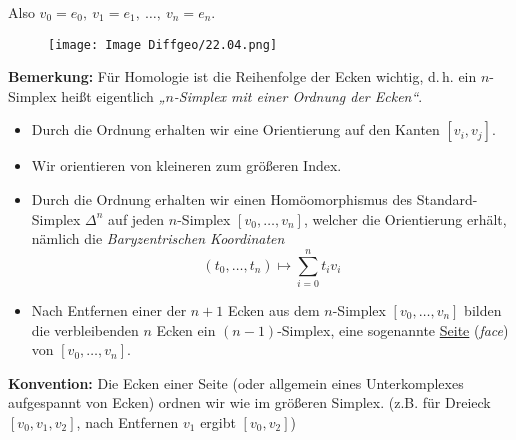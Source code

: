 \documentclass[fleqn, 12pt, letterpaper]{article}
\begin{document}
Also $v_0 = e_0,\ v_1 = e_1,\ \dots,\ v_n = e_n$.
\begin{figure}[H]
    \centering
    \texttt{[image: Image Diffgeo/22.04.png]}
 \end{figure}

\textbf{Bemerkung:}
Für Homologie ist die Reihenfolge der Ecken wichtig, d.\,h. ein $n$-Simplex heißt eigentlich \emph{„$n$-Simplex mit einer Ordnung der Ecken“}.

\begin{itemize}
  \item Durch die Ordnung erhalten wir eine Orientierung auf den Kanten $\left[ v_i, v_j \right]$.
  
  \item Wir orientieren von kleineren zum größeren Index.
  
  \item Durch die Ordnung erhalten wir einen Homöomorphismus des Standard-Simplex $\Delta^n$ auf jeden $n$-Simplex $\left[ v_0, \dots, v_n \right]$, welcher die Orientierung erhält, nämlich die \emph{Baryzentrischen Koordinaten}
  \[
  (t_0, \dots, t_n) \longmapsto \sum_{i=0}^n t_i v_i
  \]
  
  \item Nach Entfernen einer der $n+1$ Ecken aus dem $n$-Simplex $\left[ v_0, \dots, v_n \right]$ bilden die verbleibenden $n$ Ecken ein $(n-1)$-Simplex, eine sogenannte \underline{Seite} (\emph{face}) von $\left[ v_0, \dots, v_n \right]$.
\end{itemize}

\textbf{Konvention:} 
Die Ecken einer Seite (oder allgemein eines Unterkomplexes aufgespannt von Ecken) ordnen wir wie im größeren Simplex. (z.B. für Dreieck $[v_0, v_1, v_2]$, nach Entfernen $v_1$ ergibt $[v_0,v_2]$)\\
\end{document}

